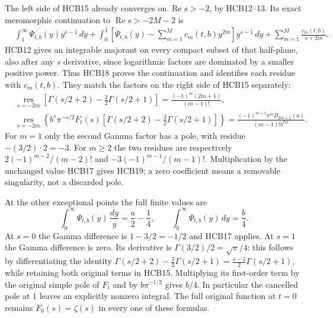 The left side of HCB15 already converges on
$\operatorname{Re}s>-2$, by HCB12--13. Its exact meromorphic
continuation to $\operatorname{Re}s>-2M-2$ is
\begin{equation}\tag{HCB18}
\begin{split}
 &\int_1^\infty\Psi_{t,b}(y)y^{s-1}\,dy
 +\int_0^1\left[\Psi_{t,b}(y)-\sum_{m=1}^M c_m(t,b)y^{2m}\right]
                y^{s-1}\,dy
 +\sum_{m=1}^M\frac{c_m(t,b)}{s+2m}.
\end{split}
\end{equation}
HCB12 gives an integrable majorant on every compact subset of that
half-plane, also after any $s$ derivative, since logarithmic factors
are dominated by a smaller positive power. Thus HCB18 proves the
continuation and identifies each residue with $c_m(t,b)$.
They match the factors on the right side of HCB15 separately:
\begin{equation}\tag{HCB19}
\begin{split}
 &\operatorname*{res}_{s=-2m}
 \left[\Gamma(s/2+2)-\frac32\Gamma(s/2+1)\right]
       =\frac{(-1)^m(2m+1)}{(m-1)!},\\
 &\operatorname*{res}_{s=-2m}
 \left\{b^s\pi^{-s/2}F_t(s)
       \left[\Gamma(s/2+2)-\frac32\Gamma(s/2+1)\right]\right\}
       =\frac{(-1)^{m+1}\pi^mB_{2m+1}(a)}{(m-1)!b^{2m}}.
\end{split}
\end{equation}
For $m=1$ only the second Gamma factor has a pole, with residue
$-(3/2)\cdot2=-3$. For $m\geq2$ the two residues are respectively
$2(-1)^{m-2}/(m-2)!$ and $-3(-1)^{m-1}/(m-1)!$.
Multiplication by the unchanged value HCB17 gives HCB19; a zero
coefficient means a removable singularity, not a discarded pole.

At the other exceptional points the full finite values are
\begin{equation}\tag{HCB20}
 \int_0^\infty\Psi_{t,b}(y)\,\frac{dy}{y}
           =\frac a2-\frac14,\qquad
 \int_0^\infty\Psi_{t,b}(y)\,dy=\frac b4.
\end{equation}
At $s=0$ the Gamma difference is $1-3/2=-1/2$ and HCB17 applies.
At $s=1$ the Gamma difference is zero. Its derivative is
$\Gamma(3/2)/2=\sqrt\pi/4$: this follows by differentiating the
identity
$\Gamma(s/2+2)-\frac32\Gamma(s/2+1)
=\frac{s-1}{2}\Gamma(s/2+1)$, while retaining both original terms
in HCB15. Multiplying its first-order term by the original simple
pole of $F_t$ and by $b\pi^{-1/2}$ gives $b/4$. In particular the
cancelled pole at $1$ leaves an explicitly nonzero integral. The
full original function at $t=0$ remains $F_0(s)=\zeta(s)$ in every
one of these formulas.

